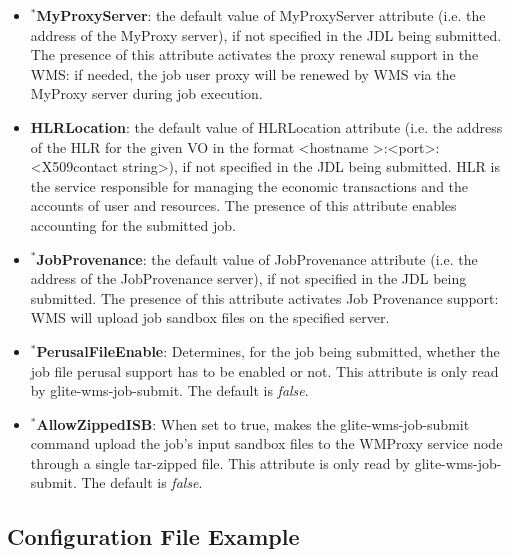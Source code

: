 \begin{itemize}
\item
$^*$\textbf{MyProxyServer}: the default value of MyProxyServer attribute (i.e. the address of the MyProxy server), if 
not specified in the JDL being submitted. The presence of this attribute activates the proxy renewal support 
in the WMS: if needed, the job user proxy will be renewed by WMS via the MyProxy server during job execution.


\item
\textbf{HLRLocation}: the default value of HLRLocation attribute (i.e. the address of the HLR for the given VO in the format 
<hostname >:<port>:<X509contact string>), if not specified in the JDL being submitted.
HLR is the service responsible for managing the economic transactions and the accounts of user and resources.
The presence of this attribute enables accounting for the submitted job.


\item
$^*$\textbf{JobProvenance}: the default value of  JobProvenance attribute (i.e. the address of the JobProvenance server), 
if not specified in the JDL being submitted. The presence of this attribute activates Job Provenance support: 
WMS will upload job sandbox files on the specified server.

\item
$^*$\textbf{PerusalFileEnable}: Determines, for the job being submitted, whether the job file perusal support has to be 
enabled or not. This attribute is only read by glite-wms-job-submit.
The default is \emph{false}.

\item
$^*$\textbf{AllowZippedISB}: When set to true, makes the glite-wms-job-submit command upload the job's input sandbox files to 
the WMProxy service node through a single tar-zipped file. This attribute is only read by glite-wms-job-submit.
The default is \emph{false}.



\end{itemize}



\subsection{Configuration File Example}
\label{confex}

